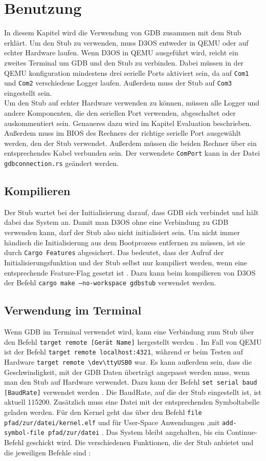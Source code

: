 \chapter{Benutzung}
In diesem Kapitel wird die Verwendung von GDB zusammen mit dem Stub erklärt. Um den Stub zu verwenden, muss D3OS entweder in QEMU oder auf echter Hardware laufen. Wenn D3OS in QEMU ausgeführt wird, reicht ein zweites Terminal um GDB und den Stub zu verbinden. Dabei müssen in der QEMU konfiguration mindestens drei serielle Ports aktiviert sein, da auf \texttt{Com1} und \texttt{Com2} verschiedene Logger laufen. Außerdem muss der Stub auf \texttt{Com3} eingestellt sein.\\
 Um den Stub auf echter Hardware verwenden zu können, müssen alle Logger und andere Komponenten, die den seriellen Port verwenden, abgeschaltet oder auskommentiert sein. Genaueres dazu wird im Kapitel Evaluation beschrieben. Außerdem muss im BIOS des Rechners der richtige serielle Port ausgewählt werden, den der Stub verwendet. Außerdem müssen die beiden Rechner über ein entsprechendes Kabel verbunden sein. Der verwendete \texttt{ComPort} kann in der Datei \texttt{gdbconnection.rs} geändert werden.

\section{Kompilieren}
Der Stub wartet bei der Initialisierung darauf, dass GDB sich verbindet und hält dabei das System an. Damit man D3OS ohne eine Verbindung zu GDB verwenden kann, darf der Stub also nicht initialisiert sein. Um nicht immer händisch die Initialisierung aus dem Bootprozess entfernen zu müssen, ist sie durch \texttt{Cargo Features} abgesichert. Das bedeutet, dass der Aufruf der Initialisierungsfunktion und der Stub selbst nur kompiliert werden, wenn eine entsprechende Feature-Flag gesetzt ist \cite{rust-lang}. Dazu kann beim kompilieren von D3OS der Befehl \texttt{cargo make --no-workspace gdbstub} verwendet werden. 

\section{Verwendung im Terminal}
Wenn GDB im Terminal verwendet wird, kann eine Verbindung zum Stub über den Befehl \texttt{target remote [Gerät Name]} hergestellt werden \cite{gdb}. Im Fall von QEMU ist der Befehl \texttt{target remote localhost:4321}, während er beim Testen auf Hardware \texttt{target remote \textbackslash dev\textbackslash ttyUSB0} war. Es kann außerdem sein, dass die Geschwindigkeit, mit der GDB Daten überträgt angepasst werden muss, wenn man den Stub auf Hardware verwendet. Dazu kann der Befehl \texttt{set serial baud [BaudRate]} verwendet werden \cite{gdb}. Die BaudRate, auf die der Stub eingestellt ist, ist aktuell 115200. Zusätzlich muss eine Datei mit der entsprechenden Symboltabelle geladen werden. Für den Kernel geht das über den Befehl \texttt{file pfad/zur/datei/kernel.elf} und für User-Space Anwendungen ,mit \texttt{add-symbol-file pfad/zur/datei} \cite{gdb}. Das System bleibt angehalten, bis ein Continue-Befehl geschickt wird. Die verschiedenen Funktionen, die der Stub anbietet und die jeweiligen Befehle sind \cite{gdb}:

